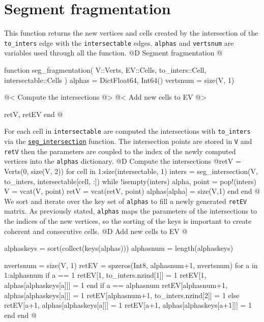 \documentclass[10pt,oneside]{article}
\begin{document}
\section{Segment fragmentation}
\label{seg_fragmentation}
This function returns the new vertices and cells created by the intersection of 
the \texttt{to\_inters} edge with the \texttt{intersectable} edges.
\texttt{alphas} and \texttt{vertsnum} are variables used through all the function.
@D Segment fragmentation
@{function seg_fragmentation(
    V::Verts, EV::Cells, 
    to_inters::Cell, intersectable::Cells
)
    alphas = Dict{Float64, Int64}()
    vertsnum = size(V, 1)

    @< Compute the intersections @>
    @< Add new cells to EV @>
    
    retV, retEV
end
@}
For each cell in \texttt{intersectable} are computed the intersections with \texttt{to\_inters} via 
the \hyperref[seg_intersection]{\texttt{seg\_intersection}} function. The intersection points are
stored in \texttt{V} and \texttt{retV} then the parameters are coupled to the index of the newly 
computed vertices into the \texttt{alphas} dictionary.
@D Compute the intersections
@{retV = Verts(0, size(V, 2))
for cell in 1:size(intersectable, 1)
    inters = seg_intersection(V, to_inters, intersectable[cell, :])
    while !isempty(inters)
        alpha, point = pop!(inters)
        V = vcat(V, point)
        retV = vcat(retV, point)
        alphas[alpha] = size(V,1)
    end
end
@}
We sort and iterate over the key set of \texttt{alphas}
to fill a newly generated \texttt{retEV} matrix. As previously stated, \texttt{alphas} maps 
the parameters of the intersections to the indices of the new vertices, so the sorting of the keys 
is important to create coherent and consecutive cells.
@D Add new cells to EV
@{alphaskeys = sort(collect(keys(alphas)))
alphasnum = length(alphaskeys)

nvertsnum = size(V, 1)
retEV = spzeros(Int8, alphasnum+1, nvertsnum)
for a in 1:alphasnum
    if a == 1
        retEV[1, to_inters.nzind[1]] = 1
        retEV[1, alphas[alphaskeys[a]]] = 1
    end
    if a == alphasnum
        retEV[alphasnum+1, alphas[alphaskeys[a]]] = 1
        retEV[alphasnum+1, to_inters.nzind[2]] = 1
    else
        retEV[a+1, alphas[alphaskeys[a]]] = 1
        retEV[a+1, alphas[alphaskeys[a+1]]] = 1
    end
end
@}


\end{document}
